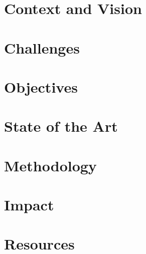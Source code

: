 \documentclass{erc-B2}
\begin{document}
\maketitle


\vfill\pagebreak


\section{Context and Vision}
\label{sec:intro}


\section{Challenges}
\label{sec:challenges}


\section{Objectives}
\label{sec:objectives}


\section{State of the Art}
\label{sec:related}


\section{Methodology} 
\label{sec:research}


\section{Impact}
\label{sec:impact}


\section{Resources}
\label{sec:resources}


\pagebreak
\bigskip
\printbibliography[prenote=bolditalics]
\end{document}
